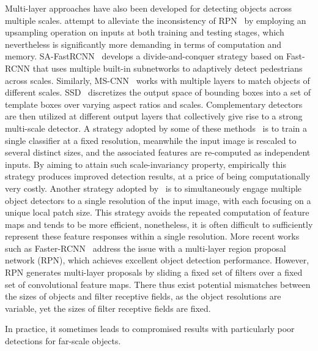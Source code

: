 \documentclass[10pt,journal,compsoc,twoside]{IEEEtran}
\begin{document}
Multi-layer approaches have also been developed for detecting objects across multiple scales. \cite{CaiEtAl:eccv16,HeEtAl:eccv14} attempt to alleviate the inconsistency of RPN~\cite{RenEtAl:nips15} by employing an upsampling operation on inputs at both training and testing stages, which nevertheless is significantly more demanding in terms of computation and memory. SA-FastRCNN~\cite{LiEtAl:cvpr15} develops a divide-and-conquer strategy based on Fast-RCNN that uses multiple built-in subnetworks to adaptively detect pedestrians across scales. Similarly, MS-CNN~\cite{CaiEtAl:eccv16} works with multiple layers to match objects of different scales. SSD~\cite{LiuEtAl:eccv16} discretizes the output space of bounding boxes into a set of template boxes over varying aspect ratios and scales. Complementary detectors are then utilized at different output layers that collectively give rise to a strong multi-scale detector.
%
A strategy adopted by some of these methods~\cite{GirEtAl:cvpr14,DolEtAl:bmvc10} is to train a single classifier at a fixed resolution, meanwhile the input image is rescaled to several distinct sizes, and the associated features are re-computed as independent inputs. By aiming to attain such scale-invariancy property, empirically this strategy produces improved detection results, at a price of being computationally very costly.
%
Another strategy adopted by~\cite{BenEtAl:cvpr12,FelEtAl:tpami10,SerEtAl:cvpr13,EnzGav:tip11} is to simultaneously engage multiple object detectors to a single resolution of the input image, with each focusing on a unique local patch size. This strategy avoids the repeated computation of feature maps and tends to be more efficient, nonetheless, it is often difficult to sufficiently represent these feature responses within a single resolution.
%
More recent works such as Faster-RCNN~\cite{RenEtAl:nips15} address the issue with a multi-layer region proposal network (RPN), which achieves excellent object detection performance. However, RPN generates multi-layer proposals by sliding a fixed set of filters over a fixed set of convolutional feature maps. There thus exist potential mismatches between the sizes of objects and filter receptive fields, as the object resolutions are variable, yet the sizes of filter receptive fields are fixed.

In practice, it sometimes leads to compromised results with particularly poor detections for far-scale objects.
\end{document}
